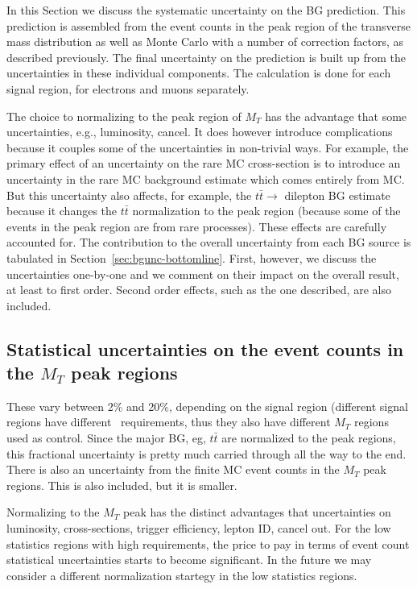
In this Section we discuss the systematic uncertainty on the BG
prediction.  This prediction is assembled from the event
counts in the peak region of the transverse mass distribution as
well as Monte Carlo 
with a number of correction factors, as described previously.
The
final uncertainty on the prediction is built up from the uncertainties in these
individual 
components. 
The calculation is done for each signal
region,
for electrons and muons separately.

The choice to normalizing to the peak region of $M_T$ has the
advantage that some uncertainties, e.g., luminosity, cancel.
It does however introduce complications because it couples
some of the uncertainties in non-trivial ways.  For example, 
the primary effect of an uncertainty on the rare MC cross-section
is to introduce an uncertainty in the rare MC background estimate
which comes entirely from MC.   But this uncertainty also affects,
for example,
the $t\bar{t} \to$ dilepton BG estimate because it changes the 
$t\bar{t}$ normalization to the peak region (because some of the 
events in the peak region are from rare processes).  These effects
are carefully accounted for.  The contribution to the overall
uncertainty from each BG source is tabulated in
Section~\ref{sec:bgunc-bottomline}.
First, however, we discuss the uncertainties one-by-one and we comment 
on their impact on the overall result, at least to first order.
Second order effects, such as the one described, are also included.

\subsection{Statistical uncertainties on the event counts in the $M_T$
peak regions}
These vary between 2\% and 20\%, depending on the signal region
(different
signal regions have different \met\ requirements, thus they also have
different $M_T$ regions used as control.
Since 
the major BG, eg, $t\bar{t}$ are normalized to the peak regions, this 
fractional uncertainty is pretty much carried through all the way to
the end.  There is also an uncertainty from the finite MC event counts
in the $M_T$ peak regions.  This is also included, but it is smaller.

Normalizing to the $M_T$ peak has the distinct advantages that 
uncertainties on luminosity, cross-sections, trigger efficiency,
lepton ID, cancel out.
For the low statistics regions with high \met requirements, the
price to pay in terms of event count statistical uncertainties starts
to become significant.  In the future we may consider a different
normalization startegy in the low statistics regions.

